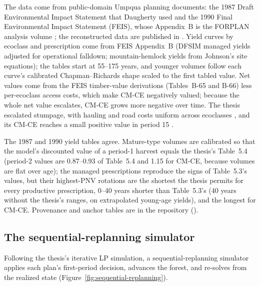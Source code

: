 The data come from public-domain Umpqua planning documents: the 1987 Draft Environmental Impact Statement that Daugherty used \citep{usda1987umpqua} and the 1990 Final Environmental Impact Statement (FEIS), whose Appendix~B is the FORPLAN analysis volume \citep{usda1990umpqua}; the reconstructed data are published in \citet{freshdaugherty}. Yield curves by ecoclass and prescription come from FEIS Appendix~B (DFSIM managed yields adjusted for operational falldown; mountain-hemlock yields from Johnson's site equations); the tables start at 55--175 years, and younger volumes follow each curve's calibrated Chapman--Richards shape scaled to the first tabled value. Net values come from the FEIS timber-value derivations (Tables~B-65 and B-66) less per-ecoclass access costs, which make CM-CE negatively valued; because the whole net value escalates, CM-CE grows more negative over time. The thesis escalated stumpage, with hauling and road costs uniform across ecoclasses \citep[p.~74]{daugherty1991credibility}, and its CM-CE reaches a small positive value in period 15 \citep[p.~76]{daugherty1991credibility}.

The 1987 and 1990 yield tables agree. Mature-type volumes are calibrated so that the model's discounted value of a period-1 harvest equals the thesis's Table~5.4 (period-2 values are 0.87--0.93 of Table~5.4 and 1.15 for CM-CE, because volumes are flat over age); the managed prescriptions reproduce the signs of Table~5.3's values, but their highest-PNV rotations are the shortest the thesis permits for every productive prescription, 0--40 years shorter than Table~5.3's (40 years without the thesis's ranges, on extrapolated young-age yields), and the longest for CM-CE. Provenance and anchor tables are in the repository ().

\hypertarget{the-sequential-replanning-simulator}{%
\subsection{The sequential-replanning simulator}\label{the-sequential-replanning-simulator}}

Following the thesis's iterative LP simulation, a sequential-replanning simulator applies each plan's first-period decision, advances the forest, and re-solves from the realized state (Figure~\ref{fig:sequential-replanning}).

